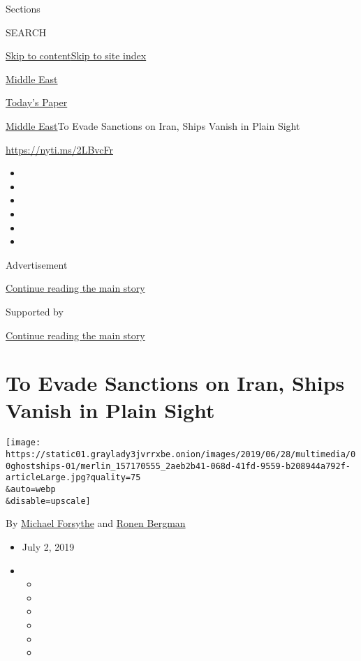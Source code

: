 Sections

SEARCH

\protect\hyperlink{site-content}{Skip to
content}\protect\hyperlink{site-index}{Skip to site index}

\href{https://www.nytimes3xbfgragh.onion/section/world/middleeast}{Middle
East}

\href{https://myaccount.nytimes3xbfgragh.onion/auth/login?response_type=cookie\&client_id=vi}{}

\href{https://www.nytimes3xbfgragh.onion/section/todayspaper}{Today's
Paper}

\href{/section/world/middleeast}{Middle East}\textbar{}To Evade
Sanctions on Iran, Ships Vanish in Plain Sight

\url{https://nyti.ms/2LBvcFr}

\begin{itemize}
\item
\item
\item
\item
\item
\item
\end{itemize}

Advertisement

\protect\hyperlink{after-top}{Continue reading the main story}

Supported by

\protect\hyperlink{after-sponsor}{Continue reading the main story}

\hypertarget{to-evade-sanctions-on-iran-ships-vanish-in-plain-sight}{%
\section{To Evade Sanctions on Iran, Ships Vanish in Plain
Sight}\label{to-evade-sanctions-on-iran-ships-vanish-in-plain-sight}}

\texttt{[image: https://static01.graylady3jvrrxbe.onion/images/2019/06/28/multimedia/00ghostships-01/merlin\_157170555\_2aeb2b41-068d-41fd-9559-b208944a792f-articleLarge.jpg?quality=75\\\&auto=webp\\\&disable=upscale]}

By \href{https://www.nytimes3xbfgragh.onion/by/michael-forsythe}{Michael
Forsythe} and
\href{https://www.nytimes3xbfgragh.onion/by/ronen-bergman}{Ronen
Bergman}

\begin{itemize}
\item
  July 2, 2019
\item
  \begin{itemize}
  \item
  \item
  \item
  \item
  \item
  \item
  \end{itemize}
\end{itemize}

